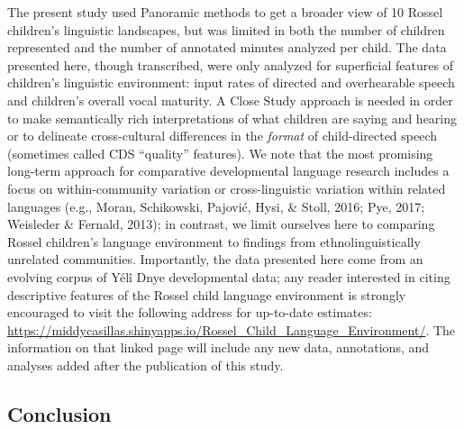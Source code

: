 \documentclass[,man,floatsintext]{apa6}
\begin{document}
The present study used Panoramic methods to get a broader view of 10
Rossel children's linguistic landscapes, but was limited in both the
number of children represented and the number of annotated minutes
analyzed per child. The data presented here, though transcribed, were
only analyzed for superficial features of children's linguistic
environment: input rates of directed and overhearable speech and
children's overall vocal maturity. A Close Study approach is needed in
order to make semantically rich interpretations of what children are
saying and hearing or to delineate cross-cultural differences in the
\emph{format} of child-directed speech (sometimes called CDS
\enquote{quality} features). We note that the most promising long-term
approach for comparative developmental language research includes a
focus on within-community variation or cross-linguistic variation within
related languages (e.g., Moran, Schikowski, Pajović, Hysi, \& Stoll,
2016; Pye, 2017; Weisleder \& Fernald, 2013); in contrast, we limit
ourselves here to comparing Rossel children's language environment to
findings from ethnolinguistically unrelated communities. Importantly,
the data presented here come from an evolving corpus of Yélî Dnye
developmental data; any reader interested in citing descriptive features
of the Rossel child language environment is strongly encouraged to visit
the following address for up-to-date estimates:
\url{https://middycasillas.shinyapps.io/Rossel_Child_Language_Environment/}.
The information on that linked page will include any new data,
annotations, and analyses added after the publication of this study.

\subsection{Conclusion}\label{disc-conclusion}
\end{document}
